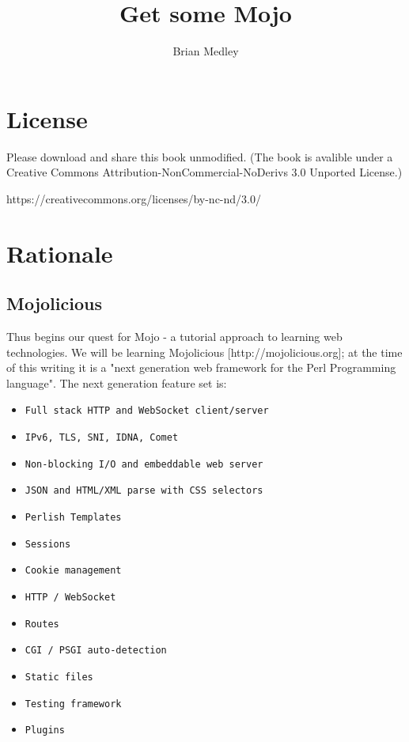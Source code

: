 \documentclass[14pt]{extreport}
\begin{document}
\title{Get some Mojo}
\author{Brian Medley}

\maketitle
\setcounter{page}{2}
\tableofcontents


\chapter*{License}

Please download and share this book unmodified. (The book is avalible under a
Creative Commons Attribution-NonCommercial-NoDerivs 3.0 Unported License.)

https://creativecommons.org/licenses/by-nc-nd/3.0/

\chapter*{Rationale}

\section{Mojolicious}

Thus begins our quest for Mojo - a tutorial approach to learning web
technologies. We will be learning Mojolicious [http://mojolicious.org]; at the
time of this writing it is a "next generation web framework for the Perl
Programming language".  The next generation feature set is:

\begin{itemize} \itemsep1pt \parskip0pt 
\item \verb|Full stack HTTP and WebSocket client/server|
\item \verb|IPv6, TLS, SNI, IDNA, Comet|
\item \verb|Non-blocking I/O and embeddable web server|
\item \verb|JSON and HTML/XML parse with CSS selectors|
\item \verb|Perlish Templates|
\item \verb|Sessions|
\item \verb|Cookie management|
\item \verb|HTTP / WebSocket|
\item \verb|Routes|
\item \verb|CGI / PSGI auto-detection|
\item \verb|Static files|
\item \verb|Testing framework|
\item \verb|Plugins|
\end{itemize}
\end{document}
